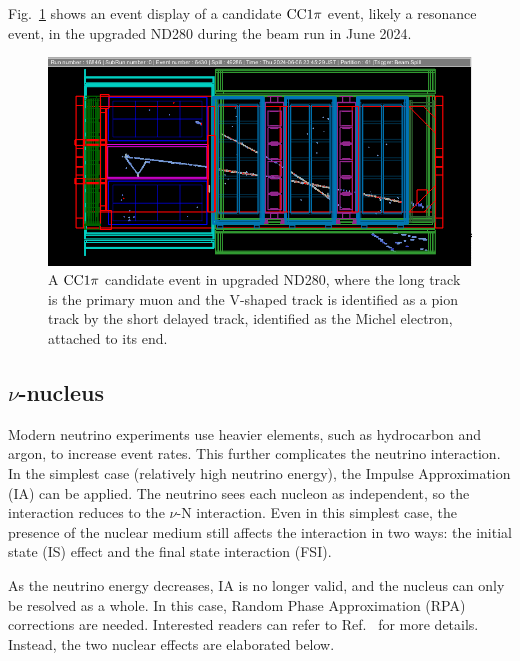 Fig.~\ref{fig:cc1pi} shows an event display of a candidate $\textrm{CC}1\pi$ event, likely a resonance event, in the upgraded ND280 during the beam run in June 2024.

\begin{figure}[!htb] 	
    \centering 		
    \includegraphics[width=\sgfigwid\textwidth]{figures/shortME.png}
    \caption{\label{fig:cc1pi} A $\textrm{CC}1\pi$ candidate event in upgraded ND280, where the long track is the primary muon and the V-shaped track is identified as a pion track by the short delayed track, identified as the Michel electron, attached to its end.} 
\end{figure}

\subsection{$\nu$-nucleus}
\label{sec:nuint-nucleus}
Modern neutrino experiments use heavier elements, such as hydrocarbon and argon, to increase event rates.
This further complicates the neutrino interaction.
In the simplest case (relatively high neutrino energy), the Impulse Approximation (IA) can be applied.
The neutrino sees each nucleon as independent, so the interaction reduces to the $\nu$-N interaction.
Even in this simplest case, the presence of the nuclear medium still affects the interaction in two ways: the initial state (IS) effect and the final state interaction (FSI).

As the neutrino energy decreases, IA is no longer valid, and the nucleus can only be resolved as a whole.
In this case, Random Phase Approximation (RPA) corrections are needed.
Interested readers can refer to Ref.~\cite{SajjadAthar:2022pjt} for more details.
Instead, the two nuclear effects are elaborated below.

